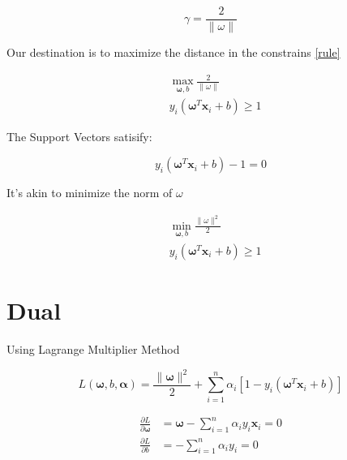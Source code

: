 \documentclass[a4paper,12pt]{article}
\begin{document}
        \begin{equation}
            \gamma=\frac{2}{\|\omega\|}
        \end{equation}

        Our destination is to maximize the distance in the constrains \ref{rule}

        \begin{equation}
            \begin{split}
                & \max_{\bm{\omega},b} \frac{2}{\|\omega\|}\\
                & y_i(\bm{\omega}^T\bm{x}_i+b)\geq 1
            \end{split}
        \end{equation}

        The Support Vectors satisify:

        \begin{equation}
            y_i(\bm{\omega}^T\bm{x}_i+b)-1=0
        \end{equation}

        It's akin to minimize the norm of $\omega$

        \begin{equation}
            \begin{split}
                & \min_{\bm{\omega},b} \frac{\|\omega\|^2}{2}\\
                & y_i(\bm{\omega}^T\bm{x}_i+b)\geq 1
            \end{split}
        \end{equation}

    \section{Dual}

        Using Lagrange Multiplier Method

        \begin{equation}
            L(\bm{\omega},b,\bm{\alpha})=\frac{\|\bm{\omega}\|^2}{2}+\sum_{i=1}^n\alpha_i[1-y_i(\bm{\omega}^T\bm{x}_i+b)]
        \end{equation}

        \begin{equation}
            \begin{split}
                \frac{\partial L}{\partial \bm{\omega}}&=\bm{\omega}-\sum_{i=1}^n\alpha_iy_i\bm{x}_i=0\\
                \frac{\partial L}{\partial b}&=-\sum_{i=1}^n\alpha_iy_i=0
            \end{split}
        \end{equation}
\end{document}
